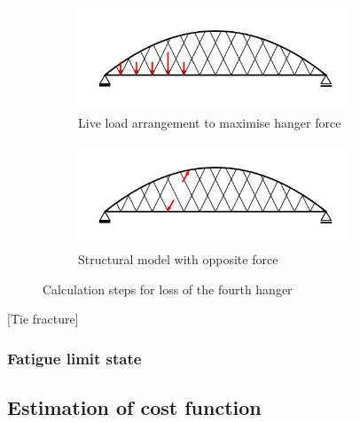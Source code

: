 \begin{figure}[H]
\centering
\begin{subfigure}{0.5\textwidth}
    \centering
    \includegraphics[trim={0 0.8cm 0 0.8cm},clip, width=0.9\textwidth]{illustrations/figures/cable loss - load arrangement.png}
    \caption{Live load arrangement to maximise hanger force}
    \label{fig:Cable_Loss_1}
\end{subfigure}%
\begin{subfigure}{.5\textwidth}
    \centering
    \includegraphics[trim={0 0.8cm 0 0.8cm},clip, width=0.9\textwidth]{illustrations/figures/cable loss.png}
    \caption{Structural model with opposite force}
    \label{fig:Cable_Loss_2}
\end{subfigure}
\caption{Calculation steps for loss of the fourth hanger}
\label{fig:Cable_Loss}
\end{figure}

[Tie fracture]

\subsubsection{Fatigue limit state}



\subsection{Estimation of cost function} \label{sec:met_cost}
